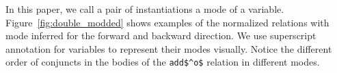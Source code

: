 In this paper, we call a pair of instantiations a mode of a variable.
Figure~\ref{fig:double_modded} shows examples of the normalized \mk relations with mode inferred for the forward and backward direction.
We use superscript annotation for variables to represent their modes visually.
Notice the different order of conjuncts in the bodies of the \lstinline{add$^o$} relation in different modes.




